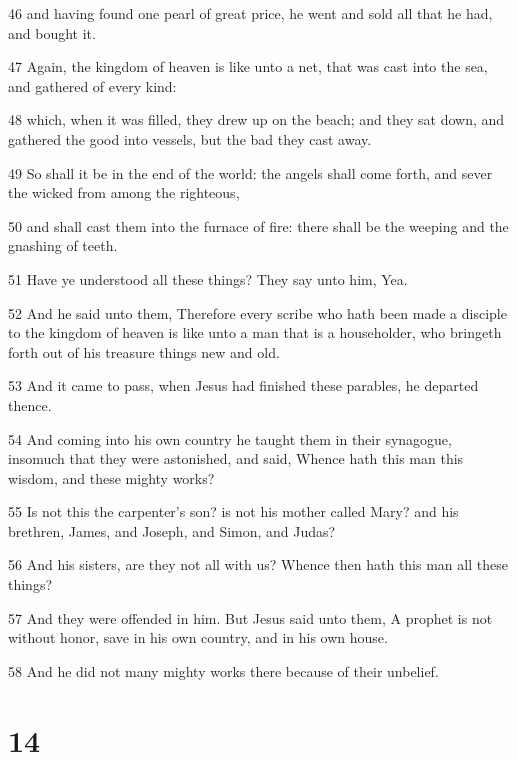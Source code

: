 \par 46 and having found one pearl of great price, he went and sold all that he had, and bought it.
\par 47 Again, the kingdom of heaven is like unto a net, that was cast into the sea, and gathered of every kind:
\par 48 which, when it was filled, they drew up on the beach; and they sat down, and gathered the good into vessels, but the bad they cast away.
\par 49 So shall it be in the end of the world: the angels shall come forth, and sever the wicked from among the righteous,
\par 50 and shall cast them into the furnace of fire: there shall be the weeping and the gnashing of teeth.
\par 51 Have ye understood all these things? They say unto him, Yea.
\par 52 And he said unto them, Therefore every scribe who hath been made a disciple to the kingdom of heaven is like unto a man that is a householder, who bringeth forth out of his treasure things new and old.
\par 53 And it came to pass, when Jesus had finished these parables, he departed thence.
\par 54 And coming into his own country he taught them in their synagogue, insomuch that they were astonished, and said, Whence hath this man this wisdom, and these mighty works?
\par 55 Is not this the carpenter's son? is not his mother called Mary? and his brethren, James, and Joseph, and Simon, and Judas?
\par 56 And his sisters, are they not all with us? Whence then hath this man all these things?
\par 57 And they were offended in him. But Jesus said unto them, A prophet is not without honor, save in his own country, and in his own house.
\par 58 And he did not many mighty works there because of their unbelief.

\chapter{14}

